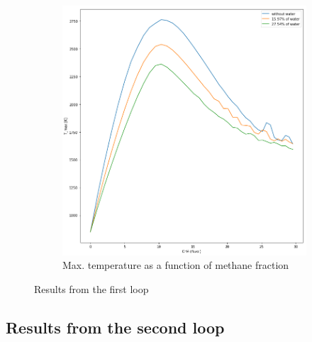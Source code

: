 \documentclass[a4paper]{article}
\begin{document}
\begin{figure}[H]
\begin{subfigure}[b]{0.4\textwidth}
        \includegraphics[width=\textwidth]{1_Tmax_to_CH4.png}
        	\caption{Max. temperature as a function of methane fraction}
        \label{fig:1_2}
    \end{subfigure}
    \caption{Results from the first loop}\label{fig:1}
\end{figure}

\subsection{Results from the second loop}
\end{document}
